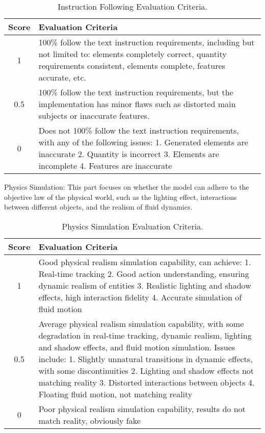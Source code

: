 \begin{table}[h]
\centering
\caption{Instruction Following Evaluation Criteria.}
\label{sample-table}
\small

\begin{tabular}{cp{11cm}}
\toprule

\textbf{Score} & \textbf{Evaluation Criteria} \\
\midrule
1  & 100\% follow the text instruction requirements, including but not limited to: elements completely correct, quantity requirements consistent, elements complete, features accurate, etc. \\
\midrule
0.5  & 100\% follow the text instruction requirements, but the implementation has minor flaws such as distorted main subjects or inaccurate features. \\
\midrule
0  & Does not 100\% follow the text instruction requirements, with any of the following issues:  1. Generated elements are inaccurate  2. Quantity is incorrect  3. Elements are incomplete  4. Features are inaccurate \\
\bottomrule
\end{tabular}
\end{table}



Physics Simulation: This part focuses on whether the model can adhere to the objective law of the physical world, such as the lighting effect, interactions between different objects, and the realism of fluid dynamics. 


\begin{table}[h]
\centering
\caption{Physics Simulation Evaluation Criteria.}
\label{sample-table}
\small

\begin{tabular}{cp{11cm}}
\toprule

\textbf{Score} & \textbf{Evaluation Criteria} \\
\midrule
1  & Good physical realism simulation capability, can achieve: 1. Real-time tracking 2. Good action understanding, ensuring dynamic realism of entities 3. Realistic lighting and shadow effects, high interaction fidelity 4. Accurate simulation of fluid motion \\
\midrule
0.5  & Average physical realism simulation capability, with some degradation in real-time tracking, dynamic realism, lighting and shadow effects, and fluid motion simulation. Issues include: 1. Slightly unnatural transitions in dynamic effects, with some discontinuities 2. Lighting and shadow effects not matching reality 3. Distorted interactions between objects 4. Floating fluid motion, not matching reality \\
\midrule
0  & Poor physical realism simulation capability, results do not match reality, obviously fake \\

\bottomrule
\end{tabular}
\end{table}



